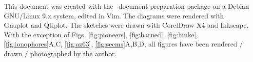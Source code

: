 \newpage
This document was created with the \LaTeXe \, document preparation package on a Debian GNU/Linux 9.x system, edited in Vim.
The diagrams were rendered with Gnuplot and Qtiplot.
The sketches were drawn with CorelDraw X4 and Inkscape.
With the exception of Figs. \ref{fig:pioneers}, \ref{fig:harned}, \ref{fig:hinke}, \ref{fig:ionophores}A,C, \ref{fig:az63}, \ref{fig:secms}A,B,D, all figures have been rendered / drawn / photographed by the author.
